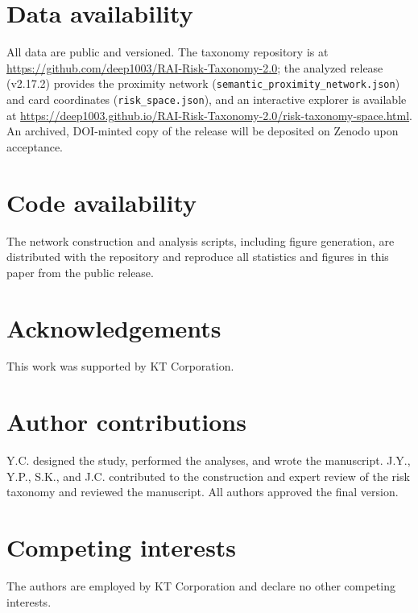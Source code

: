 \documentclass[11pt,a4paper]{article}
\begin{document}
\section*{Data availability}

All data are public and versioned. The taxonomy repository is at \url{https://github.com/deep1003/RAI-Risk-Taxonomy-2.0}; the analyzed release (v2.17.2) provides the proximity network (\texttt{semantic\_proximity\_network.json}) and card coordinates (\texttt{risk\_space.json}), and an interactive explorer is available at \url{https://deep1003.github.io/RAI-Risk-Taxonomy-2.0/risk-taxonomy-space.html}. An archived, DOI-minted copy of the release will be deposited on Zenodo upon acceptance.

\section*{Code availability}

The network construction and analysis scripts, including figure generation, are distributed with the repository and reproduce all statistics and figures in this paper from the public release.

\section*{Acknowledgements}
This work was supported by KT Corporation.

\section*{Author contributions}
Y.C. designed the study, performed the analyses, and wrote the manuscript. J.Y., Y.P., S.K., and J.C. contributed to the construction and expert review of the risk taxonomy and reviewed the manuscript. All authors approved the final version.

\section*{Competing interests}
The authors are employed by KT Corporation and declare no other competing interests.
\end{document}
